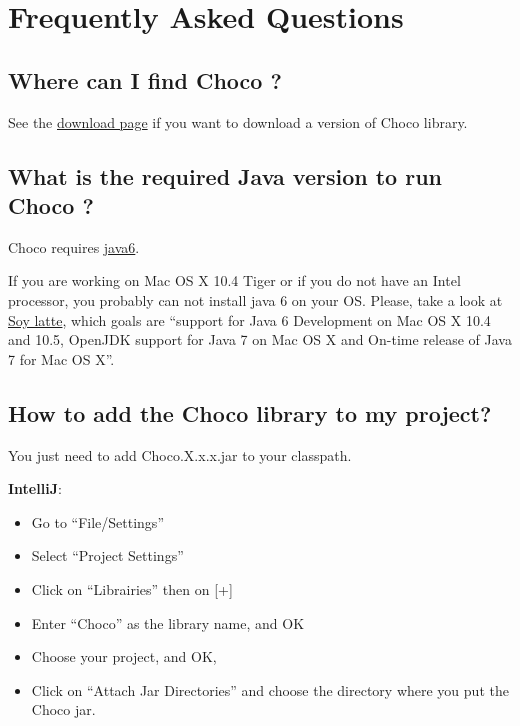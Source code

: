 \label{faq}
\hypertarget{faq}{}

\chapter{Frequently Asked Questions}\label{faq:frequentlyaskedquestions}\hypertarget{faq:frequentlyaskedquestions}{}

\section{Where can I find Choco ?}\label{faq:wherecanifindchoco}\hypertarget{faq:wherecanifindchoco}{}

See the \href{http://choco.emn.fr}{download page} if you want to download a version of Choco library.

\section{What is the required Java version to run Choco ?}\label{faq:whatistherequiredjavaversiontorunchoco}\hypertarget{faq:whatistherequiredjavaversiontorunchoco}{}

Choco requires \href{http://java.sun.com/javase/6/}{java6}.

\begin{note}
If you are working on Mac OS X 10.4 Tiger or if you do not have an Intel processor, you probably can not install java 6 on your OS. Please, take a look at \href{http://landonf.bikemonkey.org/static/soylatte/}{Soy latte}, which goals are ``support for Java 6 Development on Mac OS X 10.4 and 10.5, OpenJDK support for Java 7 on Mac OS X and On-time release of Java 7 for Mac OS X''.
\end{note}

\section{How to add the Choco library to my project?}\label{faq:howtoaddthechocolibrarytomyproject}\hypertarget{faq:howtoaddthechocolibrarytomyproject}{}


You just need to add Choco.X.x.x.jar to your classpath.

\textbf{IntelliJ}:
\begin{itemize}
	\item Go to ``File/Settings''
	\item Select ``Project Settings''
	\item Click on ``Librairies'' then on [+]
	\item Enter ``Choco'' as the library name, and OK
	\item Choose your project, and OK,
	\item Click on ``Attach Jar Directories'' and choose the directory where you put the Choco jar.
\end{itemize}

